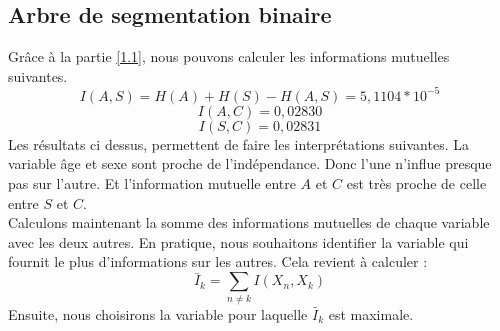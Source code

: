 \documentclass{article}
\begin{document}
\subsection{Arbre de segmentation binaire}
Grâce à la partie \ref{1.1}, nous pouvons calculer les informations mutuelles suivantes.
\[
I(A,S) = H(A) + H(S) - H(A,S) = 5,1104*10^{-5}
\]
\[
I(A,C) = 0,02830
\]
\[
I(S,C)= 0,02831
\]
Les résultats ci dessus, permettent de faire les interprétations suivantes. La variable âge et sexe sont proche de l'indépendance. Donc l'une n'influe presque pas sur l'autre. Et l'information mutuelle entre $A$ et $C$ est très proche de celle entre $S$ et $C$.
\\
Calculons maintenant la somme des informations mutuelles de chaque variable avec les deux autres. En pratique, nous souhaitons identifier la variable qui fournit le plus d'informations sur les autres. Cela revient à calculer :
\begin{equation}
    \bar{I}_k = \sum_{n \neq k} I(X_n, X_k)
    \label{eq : I bar}
\end{equation}
Ensuite, nous choisirons la variable pour laquelle \( \bar{I}_k \) est maximale.
\end{document}
